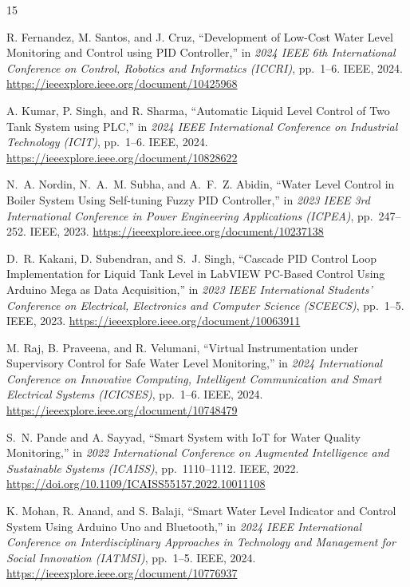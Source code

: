 \documentclass[12pt,a4paper]{article}
\begin{document}
\begin{thebibliography}{15}

R. Fernandez, M. Santos, and J. Cruz,
``Development of Low-Cost Water Level Monitoring and Control using PID Controller,''
in \textit{2024 IEEE 6th International Conference on Control, Robotics and Informatics (ICCRI)},
pp.~1--6. IEEE, 2024.
\url{https://ieeexplore.ieee.org/document/10425968}

A. Kumar, P. Singh, and R. Sharma,
``Automatic Liquid Level Control of Two Tank System using PLC,''
in \textit{2024 IEEE International Conference on Industrial Technology (ICIT)},
pp.~1--6. IEEE, 2024.
\url{https://ieeexplore.ieee.org/document/10828622}

N.~A. Nordin, N.~A.~M. Subha, and A.~F.~Z. Abidin,
``Water Level Control in Boiler System Using Self-tuning Fuzzy PID Controller,''
in \textit{2023 IEEE 3rd International Conference in Power Engineering Applications (ICPEA)},
pp.~247--252. IEEE, 2023.
\url{https://ieeexplore.ieee.org/document/10237138}

D.~R. Kakani, D. Subendran, and S.~J. Singh,
``Cascade PID Control Loop Implementation for Liquid Tank Level in LabVIEW PC-Based Control Using Arduino Mega as Data Acquisition,''
in \textit{2023 IEEE International Students' Conference on Electrical, Electronics and Computer Science (SCEECS)},
pp.~1--5. IEEE, 2023.
\url{https://ieeexplore.ieee.org/document/10063911}

M. Raj, B. Praveena, and R. Velumani,
``Virtual Instrumentation under Supervisory Control for Safe Water Level Monitoring,''
in \textit{2024 International Conference on Innovative Computing, Intelligent Communication and Smart Electrical Systems (ICICSES)},
pp.~1--6. IEEE, 2024.
\url{https://ieeexplore.ieee.org/document/10748479}

S.~N. Pande and A. Sayyad,
``Smart System with IoT for Water Quality Monitoring,''
in \textit{2022 International Conference on Augmented Intelligence and Sustainable Systems (ICAISS)},
pp.~1110--1112. IEEE, 2022.
\url{https://doi.org/10.1109/ICAISS55157.2022.10011108}

K. Mohan, R. Anand, and S. Balaji,
``Smart Water Level Indicator and Control System Using Arduino Uno and Bluetooth,''
in \textit{2024 IEEE International Conference on Interdisciplinary Approaches in Technology and Management for Social Innovation (IATMSI)},
pp.~1--5. IEEE, 2024.
\url{https://ieeexplore.ieee.org/document/10776937}


\end{thebibliography}
\end{document}
